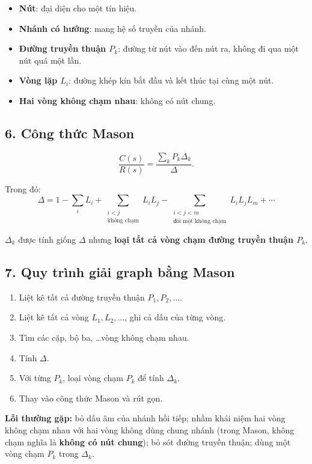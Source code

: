 \begin{itemize}[leftmargin=1.7em,itemsep=0.2em]
  \item \textbf{Nút}: đại diện cho một tín hiệu.
  \item \textbf{Nhánh có hướng}: mang hệ số truyền của nhánh.
  \item \textbf{Đường truyền thuận $P_k$}: đường từ nút vào đến nút ra, không đi qua một nút quá một lần.
  \item \textbf{Vòng lặp $L_i$}: đường khép kín bắt đầu và kết thúc tại cùng một nút.
  \item \textbf{Hai vòng không chạm nhau}: không có nút chung.
\end{itemize}

\subsection*{6. Công thức Mason}

\[
\boxed{
\frac{C(s)}{R(s)}
=
\frac{\displaystyle\sum_k P_k\Delta_k}{\Delta}.
}
\]

Trong đó:
\[
\boxed{
\Delta
=
1-\sum_iL_i
+\sum_{\substack{i<j\\\text{không chạm}}}L_iL_j
-\sum_{\substack{i<j<m\\\text{đôi một không chạm}}}L_iL_jL_m
+\cdots
}
\]

$\Delta_k$ được tính giống $\Delta$ nhưng \textbf{loại tất cả vòng chạm đường truyền thuận $P_k$}.

\subsection*{7. Quy trình giải graph bằng Mason}

\begin{enumerate}[leftmargin=1.9em,itemsep=0.2em]
  \item Liệt kê tất cả đường truyền thuận $P_1,P_2,\ldots$.
  \item Liệt kê tất cả vòng $L_1,L_2,\ldots$, ghi cả dấu của từng vòng.
  \item Tìm các cặp, bộ ba, \ldots vòng không chạm nhau.
  \item Tính $\Delta$.
  \item Với từng $P_k$, loại vòng chạm $P_k$ để tính $\Delta_k$.
  \item Thay vào công thức Mason và rút gọn.
\end{enumerate}

\medskip
\noindent\textbf{Lỗi thường gặp:}
bỏ dấu âm của nhánh hồi tiếp; nhầm khái niệm hai vòng không chạm nhau với hai vòng không dùng chung nhánh
(trong Mason, không chạm nghĩa là \textbf{không có nút chung});
bỏ sót đường truyền thuận; dùng một vòng chạm $P_k$ trong $\Delta_k$.


